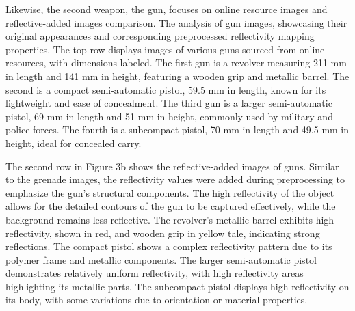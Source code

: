 \documentclass[journal,article,submit,pdftex,moreauthors]{Definitions/mdpi}
\begin{document}

Likewise, the second weapon, the gun, focuses on online resource images and reflective-added images comparison. The analysis of gun images, showcasing their original appearances and corresponding preprocessed reflectivity mapping properties. The top row displays images of various guns sourced from online resources, with dimensions labeled. The first gun is a revolver measuring 211 mm in length and 141 mm in height, featuring a wooden grip and metallic barrel. The second is a compact semi-automatic pistol, 59.5 mm in length, known for its lightweight and ease of concealment. The third gun is a larger semi-automatic pistol, 69 mm in length and 51 mm in height, commonly used by military and police forces. The fourth is a subcompact pistol, 70 mm in length and 49.5 mm in height, ideal for concealed carry.

The second row in Figure 3b shows the reflective-added images of guns. Similar to the grenade images, the reflectivity values were added during preprocessing to emphasize the gun's structural components. The high reflectivity of the object allows for the detailed contours of the gun to be captured effectively, while the background remains less reflective. The revolver's metallic barrel exhibits high reflectivity, shown in red, and wooden grip in yellow tale, indicating strong reflections. The compact pistol shows a complex reflectivity pattern due to its polymer frame and metallic components. The larger semi-automatic pistol demonstrates relatively uniform reflectivity, with high reflectivity areas highlighting its metallic parts. The subcompact pistol displays high reflectivity on its body, with some variations due to orientation or material properties.



\end{document}
